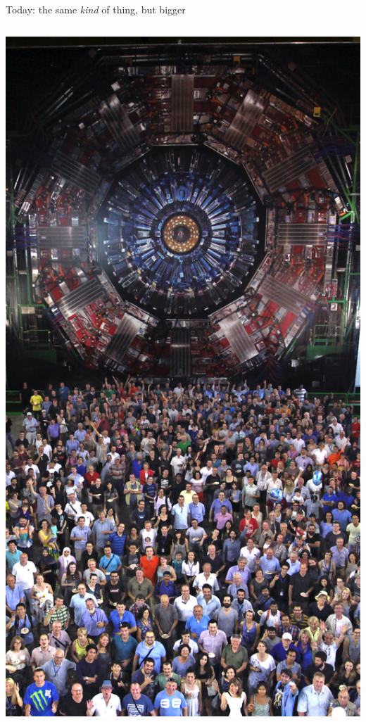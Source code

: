\documentclass[aspectratio=169]{beamer}
\begin{document}
\begin{frame}{Today: the same {\it kind} of thing, but bigger}
\begin{columns}
\includegraphics[width=\linewidth]{img/cms25_2.jpg}
\end{columns}
\end{frame}
\end{document}

